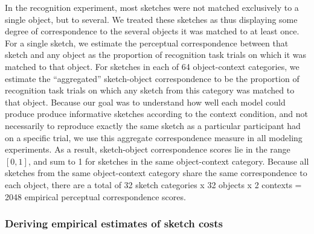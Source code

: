 \documentclass[9pt,twocolumn,twoside]{pnas-new}
\begin{document}
{%
In the recognition experiment, most sketches were not matched exclusively to a single object, but to several. 
We treated these sketches as thus displaying some degree of correspondence to the several objects it was matched to at least once. 
For a single sketch, we estimate the perceptual correspondence between that sketch and any object as the proportion of recognition task trials on which it was matched to that object. 
For sketches in each of 64 object-context categories, we estimate the ``aggregated'' sketch-object correspondence to be the proportion of recognition task trials on which any sketch from this category was matched to that object. 
Because our goal was to understand how well each model could produce produce informative sketches according to the context condition, and not necessarily to reproduce exactly the same sketch as a particular participant had on a specific trial, we use this aggregate correspondence measure in all modeling experiments.  
As a result, sketch-object correspondence scores lie in the range $[0,1]$, and sum to 1 for sketches in the same object-context category. 
Because all sketches from the same object-context category share the same correspondence to each object, there are a total of 32 sketch categories x 32 objects x 2 contexts = 2048 empirical perceptual correspondence scores.


\subsubsection*{Deriving empirical estimates of sketch costs}

}
\end{document}
